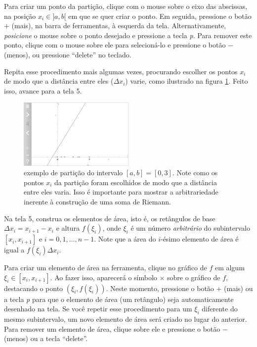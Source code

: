 \documentclass[a4paper,12pt]{scrartcl}
\begin{document}
\begin{compactenum}
      Para criar um ponto da partição, clique com o mouse sobre o eixo das abscissas, na posição $x_i \in ]a,b[$ em que se quer criar o ponto. Em seguida, pressione o botão $+$ (mais), na barra de ferramentas, à esquerda da tela. Alternativamente, \emph{posicione} o mouse sobre o ponto desejado e pressione a tecla \textit{p}. Para remover este ponto, clique com o mouse sobre ele para selecioná-lo e pressione o botão $-$ (menos), ou pressione ``delete'' no teclado.
      
      Repita esse procedimento mais algumas vezes, procurando escolher os pontos $x_i$ de modo que a distância entre eles ($\Delta x_i$) varie, como ilustrado na figura \ref{fig:particao}. Feito isso, avance para a tela 5.
      
      \begin{figure}
	\centering
	\includegraphics[width=0.5\textwidth]{particao.png}
	\caption{exemplo de partição do intervalo $[a,b] = [0,3]$. Note como os pontos $x_i$ da partição foram escolhidos de modo que a distância entre eles varia. Isso é importante para mostrar a arbitrariedade inerente à construção de uma soma de Riemann.}
	\label{fig:particao}
      \end{figure}

      \item Na tela 5, construa os elementos de área, isto é, os retângulos de base $\Delta x_i = x_{i+1} - x_i$ e altura $f(\xi_i)$, onde $\xi_i$ é um número \emph{arbitrário} do subintervalo $[x_i, x_{i+1}]$ e $i = 0,1,\ldots,n-1$. Note que a área do $i$-ésimo elemento de área é igual a $f(\xi_i)\Delta x_i$.
      
      Para criar um elemento de área na ferramenta, clique no gráfico de $f$ em algum $\xi_i \in [x_i,x_{i+1}]$. Ao fazer isso, aparecerá o símbolo $\times$ sobre o gráfico de $f$, destacando o ponto $\left(\xi_i, f(\xi_i)\right)$. Neste momento, pressione o botão $+$ (mais) ou a tecla \textit{p} para que o elemento de área (um retângulo) seja automaticamente desenhado na tela. Se você repetir esse procedimento para um $\xi_i$ diferente do mesmo subintervalo, um novo elemento de área será criado no lugar do anterior. Para remover um elemento de área, clique sobre ele e pressione o botão $-$ (menos) ou a tecla ``delete''.
      

\end{compactenum}
\end{document}
